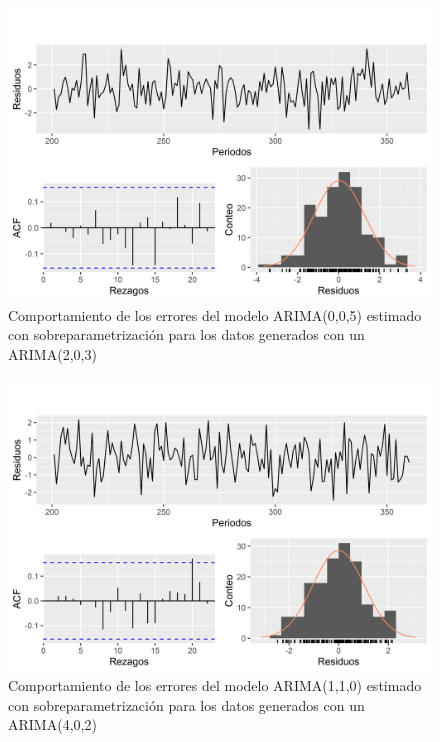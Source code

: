 \documentclass[
]{article}
\begin{document}
\begin{figure}[H]
\includegraphics[width=1\linewidth,height=1\textheight]{Tesis_files/figure-latex/errores_simulados_sobreparametrizacion3-1} \caption{Comportamiento de los errores del modelo ARIMA(0,0,5) estimado con sobreparametrización para los datos generados con un ARIMA(2,0,3)}\label{fig:errores_simulados_sobreparametrizacion3}
\end{figure}

\begin{figure}[H]
\includegraphics[width=1\linewidth,height=1\textheight]{Tesis_files/figure-latex/errores_simulados_sobreparametrizacion4-1} \caption{Comportamiento de los errores del modelo ARIMA(1,1,0) estimado con sobreparametrización para los datos generados con un ARIMA(4,0,2)}\label{fig:errores_simulados_sobreparametrizacion4}
\end{figure}
\end{document}
